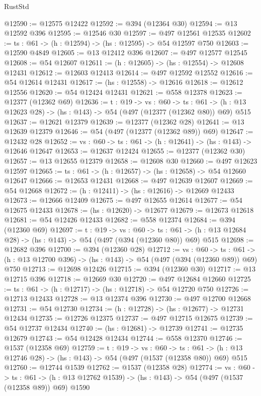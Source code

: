 \begin{lexlean}{RustStd}
\begin{coremodule}
@12590 := @12575 @12422
@12592 := @394 (@12364 @30)
@12594 := @13 @12592 @396
@12595 := @12546 @30
@12597 := @497 @12561 @12535
@12602 := {ts : @61} -> (h : @12594) -> (hs : @12595) -> @54 @12597 @750
@12603 := @12590 @4849
@12605 := @13 @12412 @396
@12607 := @497 @12577 @12545
@12608 := @54 @12607
@12611 := (h : @12605) -> (hs : @12554) -> @12608 @12431
@12612 := @12603 @12413
@12614 := @497 @12592 @12552
@12616 := @54 @12614 @12431
@12617 := (hs : @12558) -> @12616
@12618 := @12612 @12556
@12620 := @54 @12424 @12431
@12621 := @558 @12378
@12623 := @12377 (@12362 @69)
@12636 := {t : @19} ->
  {vs : @60} ->
  {ts : @61} -> (h : @13 @12623 @28) -> (hs : @143) -> @54 (@497 (@12377 (@12362 @80)) @69) @515
@12637 := @12621 @12379
@12639 := @12377 (@12362 @28)
@12641 := @13 @12639 @12379
@12646 := @54 (@497 (@12377 (@12362 @89)) @69)
@12647 := @12432 @28
@12652 := {vs : @60} -> {ts : @61} -> (h : @12641) -> (hs : @143) -> @12646 @12647
@12653 := @12637 @12424
@12655 := @12377 (@12362 @30)
@12657 := @13 @12655 @12379
@12658 := @12608 @30
@12660 := @497 @12623 @12597
@12665 := {ts : @61} -> (h : @12657) -> (hs : @12658) -> @54 @12660 @12647
@12666 := @12653 @12431
@12668 := @497 @12639 @12607
@12669 := @54 @12668
@12672 := (h : @12411) -> (hs : @12616) -> @12669 @12433
@12673 := @12666 @12409
@12675 := @497 @12655 @12614
@12677 := @54 @12675 @12433
@12678 := (hs : @12620) -> @12677
@12679 := @12673 @12618
@12681 := @54 @12426 @12433
@12682 := @558 @12374
@12684 := @394 (@12360 @69)
@12697 := {t : @19} ->
  {vs : @60} ->
  {ts : @61} -> (h : @13 @12684 @28) -> (hs : @143) -> @54 (@497 (@394 (@12360 @80)) @69) @515
@12698 := @12682 @396
@12700 := @394 (@12360 @28)
@12712 := {vs : @60} ->
  {ts : @61} -> (h : @13 @12700 @396) -> (hs : @143) -> @54 (@497 (@394 (@12360 @89)) @69) @750
@12713 := @12698 @12426
@12715 := @394 (@12360 @30)
@12717 := @13 @12715 @396
@12718 := @12669 @30
@12720 := @497 @12684 @12660
@12725 := {ts : @61} -> (h : @12717) -> (hs : @12718) -> @54 @12720 @750
@12726 := @12713 @12433
@12728 := @13 @12374 @396
@12730 := @497 @12700 @12668
@12731 := @54 @12730
@12734 := (h : @12728) -> (hs : @12677) -> @12731 @12434
@12735 := @12726 @12375
@12737 := @497 @12715 @12675
@12739 := @54 @12737 @12434
@12740 := (hs : @12681) -> @12739
@12741 := @12735 @12679
@12743 := @54 @12428 @12434
@12744 := @558 @12370
@12746 := @1537 (@12358 @69)
@12759 := {t : @19} ->
  {vs : @60} ->
  {ts : @61} -> (h : @13 @12746 @28) -> (hs : @143) -> @54 (@497 (@1537 (@12358 @80)) @69) @515
@12760 := @12744 @1539
@12762 := @1537 (@12358 @28)
@12774 := {vs : @60} ->
  {ts : @61} -> (h : @13 @12762 @1539) -> (hs : @143) -> @54 (@497 (@1537 (@12358 @89)) @69) @1590

\end{coremodule}
\end{lexlean}
